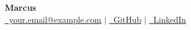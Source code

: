 \begin{center}
    {\Huge \textbf{Marcus}}\\[0.5em]
    \href{mailto:your.email@example.com}{\faEnvelope\ your.email@example.com} $|$
    \href{https://github.com/yourgithub}{\faGithub\ GitHub} $|$
    \href{https://linkedin.com/in/yourlinkedin}{\faLinkedin\ LinkedIn}
\end{center} 
